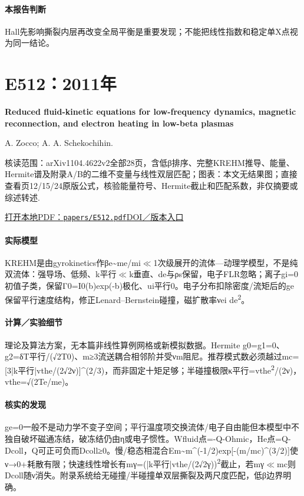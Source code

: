 \paragraph{本报告判断}Hall先影响撕裂内层再改变全局平衡是重要发现；不能把线性指数和稳定单X点视为同一结论。

\section{E512：2011年}\label{paper:E512}

\textbf{Reduced fluid-kinetic equations for low-frequency dynamics,  magnetic reconnection,  and electron heating in low-beta plasmas}\citep{E512}\

A. Zocco;  A. A. Schekochihin.

\textsf{核读范围：}arXiv1104.4622v2全部28页，含低β排序、完整KREHM推导、能量、Hermite谱及附录A/B的二维不变量与线性双层匹配；\textsf{图表：}本文无结果图；直接查看页12/15/24原版公式，核验能量符号、Hermite截止和匹配系数，非仅摘要或综述转述.

\href{run:papers/E512.pdf}{打开本地PDF：\texttt{papers/E512.pdf}}\quad\href{https://doi.org/10.1063/1.3628639}{DOI／版本入口}

\paragraph{实际模型}KREHM是由gyrokinetics作βe\textasciitilde{}me/mi\ensuremath{\ll}1次级展开的流体—动理学模型，不是纯双流体：强导场、低频、k平行\ensuremath{\ll}k垂直、de与ρs保留，电子FLR忽略；离子gi=0初值子类，保留Γ0=I0(b)exp(-b)极化、ui平行0。电子分布扣除密度/流矩后的ge保留平行速度结构，修正Lenard–Bernstein碰撞，磁扩散率νei de\textsuperscript{2}。

\paragraph{计算／实验细节}理论及算法方案，无本篇非线性算例网格或新模拟数据。Hermite g0=g1=0、g2=δT平行/(√2T0)、m≥3流送耦合相邻阶并受νm阻尼。推荐模式数必须越过mc=[3|k平行|vthe/(2√2ν)]\textasciicircum{}(2/3)，而非固定十矩足够；半碰撞极限κ平行=vthe\textsuperscript{2}/(2ν)，vthe=√(2Te/me)。

\paragraph{核实的发现}ge=0一般不是动力学不变子空间；平行温度项交换流体/电子自由能但本模型中不独自破坏磁通冻结，破冻结仍由η或电子惯性。Wfluid点=-Q-Ohmic，He点=Q-Dcoll，Q可正可负而Dcoll≥0。慢/稳态相混合Em\textasciitilde{}m\textasciicircum{}(-1/2)exp[-(m/mc)\textasciicircum{}(3/2)]使ν→0+耗散有限；快速线性增长有mγ=(|k平行|vthe/(2√2γ))\textsuperscript{2}截止，若mγ\ensuremath{\ll}mc则Dcoll随ν消失。附录系统给无碰撞/半碰撞单双层撕裂及两尺度匹配，低β边界明确。


